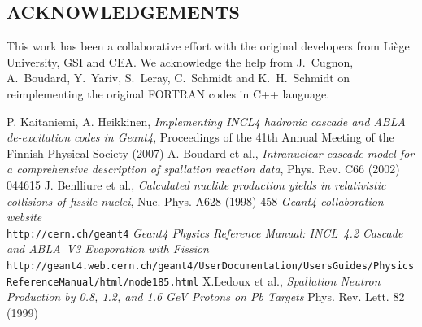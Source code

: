 \documentclass[20pt]{article}
\newenvironment{textbox}
{\begin{lrbox}{\dummybox}\begin{minipage}{0.9\columnwidth}}
{\end{minipage}\end{lrbox}\raisebox{-\depth}{\psshadowbox[framesep=1em,framearc=.1,shadow=true]{\usebox{\dummybox}}}\vspace{0.005\textheight}}
\begin{document}
\begin{center}
\begin{multicols}{3}
\begin{textbox}


\section*{{\Huge {\sf ACKNOWLEDGEMENTS}}}

This work has been a collaborative effort with the original developers from
Li\`ege University, GSI and CEA. We acknowledge the help from J.~Cugnon,
A.~Boudard, Y.~Yariv, S.~Leray, C.~Schmidt and K.~H.~Schmidt
on reimplementing the original {\sf FORTRAN} codes in {\sf C++} language.

\end{textbox}
\vskip2cm
\begin{textbox}

{\Large
{}
\begin{thebibliography}{9}
 P. Kaitaniemi, A. Heikkinen, \emph{Implementing INCL4
    hadronic cascade and ABLA de-excitation codes in Geant4},
  Proceedings of the 41th Annual Meeting of the Finnish Physical
  Society (2007)
 A. Boudard et al., \emph{Intranuclear cascade model for
    a comprehensive description of spallation reaction data}, Phys.
  Rev. C66 (2002) 044615
 J. Benlliure et al., \emph{Calculated nuclide
    production yields in relativistic collisions of fissile nuclei},
  Nuc. Phys. A628 (1998) 458
 \emph{Geant4 collaboration website} \\ {\tt http://\-cern.ch/\-geant4}
 \emph{Geant4 Physics Reference Manual: INCL~4.2 Cascade and ABLA~V3 Evaporation with Fission} \\ {\tt http://geant4.web.cern.ch/\-geant4/\-UserDocumentation/\-UsersGuides/\-PhysicsReferenceManual/\-html/\-node185.html}
 X.Ledoux et al., \emph{Spallation Neutron Production by
  0.8, 1.2, and 1.6 GeV Protons on Pb Targets} Phys. Rev. Lett. 82
  (1999)
%
%
\end{thebibliography}
}

\end{textbox}

\end{multicols}

\end{center}
\end{document}
